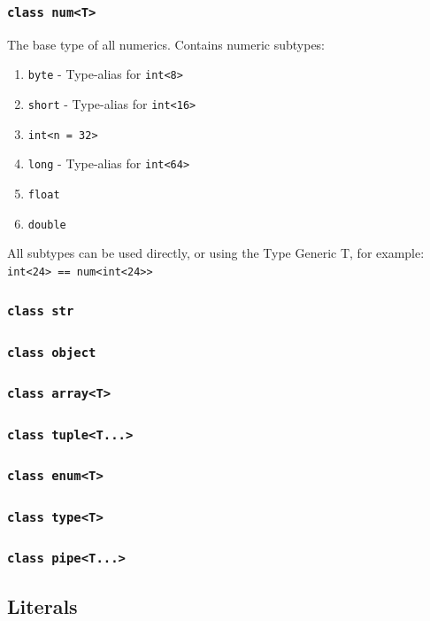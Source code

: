 \documentclass{docs}
\begin{document}
    \subsubsection{\texttt{class num<T>}}
    The base type of all numerics. Contains numeric subtypes:
    \begin{enumerate}
        \item \texttt{byte} - Type-alias for \texttt{int<8>} %
        \item \texttt{short} - Type-alias for \texttt{int<16>}
        \item \texttt{int<n = 32>}
        \item \texttt{long} - Type-alias for \texttt{int<64>}
        \item \texttt{float}
        \item \texttt{double}
    \end{enumerate}
    All subtypes can be used directly, or using the Type Generic T, for example: \texttt{int<24> == num<int<24>>}
    \subsubsection{\texttt{class str}}
    \subsubsection{\texttt{class object}}
    \subsubsection{\texttt{class array<T>}}
    \subsubsection{\texttt{class tuple<T...>}}
    \subsubsection{\texttt{class enum<T>}}
    \subsubsection{\texttt{class type<T>}}
    \subsubsection{\texttt{class pipe<T...>}}
    \subsection{Literals}
\end{document}
